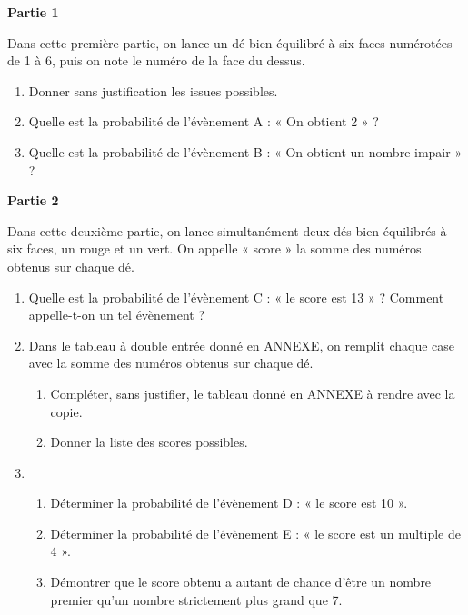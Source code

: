 
	\textbf{Partie 1}
	
	Dans cette première partie, on lance un dé bien équilibré à six faces numérotées de 1 à 6, puis on note le numéro de la face du dessus.
	
	\begin{enumerate}
		\item Donner sans justification les issues possibles.
		
		\item Quelle est la probabilité de l'évènement A : « On obtient 2 » ?
		
		\item Quelle est la probabilité de l'évènement B : « On obtient un nombre impair » ?
	\end{enumerate}

	\textbf{Partie 2}
	
	Dans cette deuxième partie, on lance simultanément deux dés bien équilibrés à six faces, un rouge et un vert. On appelle « score » la somme des numéros obtenus sur chaque dé.
	
	\begin{enumerate}
		\item Quelle est la probabilité de l'évènement C : « le score est 13 » ? Comment appelle-t-on un tel évènement ?
		
		\item Dans le tableau à double entrée donné en ANNEXE, on remplit chaque case avec la somme des numéros obtenus sur chaque dé.
		
		\begin{enumerate}
			\item Compléter, sans justifier, le tableau donné en ANNEXE à rendre avec la copie.
			
			\item Donner la liste des scores possibles.
		\end{enumerate}
	
		\item \begin{enumerate}
			\item Déterminer la probabilité de l'évènement D : « le score est 10 ».
			
			\item Déterminer la probabilité de l'évènement E : « le score est un multiple de 4 ».
			
			\item Démontrer que le score obtenu a autant de chance d'être un nombre premier qu'un nombre strictement plus grand que 7.
		\end{enumerate}
	\end{enumerate}

